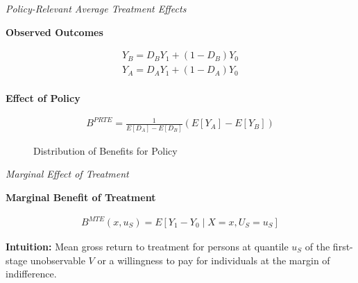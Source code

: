 \begin{frame}\begin{center}
\LARGE\textit{Policy-Relevant Average Treatment Effects}
\end{center}\end{frame}
\begin{frame}
\textbf{Observed Outcomes}

\begin{align*}
Y_B = D_B Y_1 + (1 - D_B) Y_0 \\
Y_A = D_A Y_1 + (1 - D_A) Y_0 \\
\end{align*}

\textbf{Effect of Policy}

\begin{align*}
B^{PRTE} = \frac{1}{E[D_A] - E[D_B]} (E[Y_A] - E[Y_B])
\end{align*}

\end{frame}


\begin{frame}
\begin{figure}\caption{Distribution of Benefits for Policy}
\end{figure}
\end{frame}

\begin{frame}\begin{center}
\LARGE\textit{Marginal Effect of Treatment}
\end{center}\end{frame}
\begin{frame}\textbf{Marginal Benefit of Treatment}

\begin{align*}
B^{MTE}(x, u_S) = E [Y_1 - Y_0 \mid X = x, U_S = u_S]
\end{align*}

\textbf{Intuition:} Mean gross return to treatment for persons at
quantile \(u_S\) of the first-stage unobservable \(V\) or a willingness to pay for individuals at the margin of indifference.

\end{frame}

